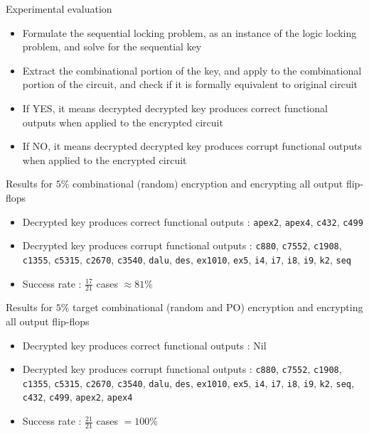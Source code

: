 \begin{frame}{Experimental evaluation}
\begin{itemize}
\item Formulate the sequential locking problem, as an instance of the logic locking problem, and solve for the sequential key
\item Extract the combinational portion of the key, and apply to the combinational portion of the circuit, and check if it is formally equivalent to original circuit
\item If \alert{YES}, it means decrypted decrypted key produces \alert{correct} functional outputs when applied to the encrypted circuit
\item If \alert{NO}, it means decrypted decrypted key produces \alert{corrupt} functional outputs when applied to the encrypted circuit
\end{itemize}
\end{frame}

\begin{frame}{Results for $5\%$ combinational (random) encryption and encrypting all output flip-flops}
\begin{itemize}
\item Decrypted key produces correct functional outputs : \texttt{apex2}, \texttt{apex4}, \texttt{c432}, \texttt{c499} 
\item Decrypted key produces corrupt functional outputs : \texttt{c880}, \texttt{c7552}, \texttt{c1908}, \texttt{c1355}, \texttt{c5315}, \texttt{c2670}, \texttt{c3540}, \texttt{dalu}, \texttt{des}, \texttt{ex1010}, \texttt{ex5}, \texttt{i4}, \texttt{i7}, \texttt{i8}, \texttt{i9}, \texttt{k2}, \texttt{seq}
\item Success rate : $\frac{17}{21}$ cases \alert{$\approx 81\%$}
\end{itemize}

\end{frame}

\begin{frame}{Results for $5\%$ target combinational (random and PO) encryption and encrypting all output flip-flops}
\begin{itemize}
\item Decrypted key produces correct functional outputs : \alert{Nil}
\item Decrypted key produces corrupt functional outputs : \texttt{c880}, \texttt{c7552}, \texttt{c1908}, \texttt{c1355}, \texttt{c5315}, \texttt{c2670}, \texttt{c3540}, \texttt{dalu}, \texttt{des}, \texttt{ex1010}, \texttt{ex5}, \texttt{i4}, \texttt{i7}, \texttt{i8}, \texttt{i9}, \texttt{k2}, \texttt{seq}, \texttt{c432}, \texttt{c499}, \texttt{apex2}, \texttt{apex4}
\item Success rate : $\frac{21}{21}$ cases \alert{$= 100 \%$}
\end{itemize}

\end{frame}

